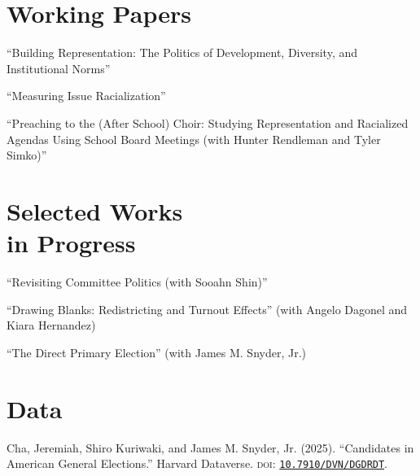 \documentclass[margin, line]{res}
\begin{document}
\begin{resume}
\section{Working Papers}
\begin{etaremune}
	\item ``Building Representation: The Politics of Development, Diversity, and
Institutional Norms''
	\item ``Measuring Issue Racialization''
	\item ``Preaching to the (After School) Choir: Studying Representation and Racialized Agendas Using School Board Meetings (with Hunter Rendleman and Tyler Simko)'' 
\end{etaremune}

\section{Selected Works \\in Progress}
\begin{etaremune}
	\item ``Revisiting Committee Politics (with Sooahn Shin)''
	\item ``Drawing Blanks: Redistricting and Turnout Effects'' (with Angelo Dagonel and Kiara Hernandez)
	\item ``The Direct Primary Election'' (with James M. Snyder, Jr.)
\end{etaremune}

\section{Data}
\begin{etaremune}
	\item Cha, Jeremiah, Shiro Kuriwaki, and James M. Snyder, Jr. (2025). ``Candidates in American General Elections.'' Harvard Dataverse. \textsc{doi}: \href{https://doi.org/10.7910/DVN/DGDRDT}{\texttt{10.7910/DVN/DGDRDT}}.
\end{etaremune}


\end{resume}
\end{document}
